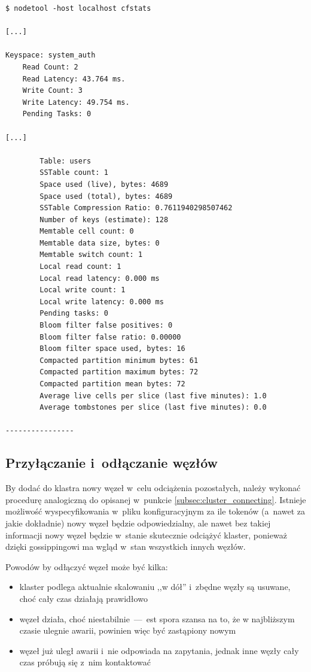 \documentclass{article} %
\begin{document}
\begin{lstlisting}[style=bash, caption={statystyki dla przestrzeni kluczy \texttt{system\_auth}}]
$ nodetool -host localhost cfstats

[...]

Keyspace: system_auth
	Read Count: 2
	Read Latency: 43.764 ms.
	Write Count: 3
	Write Latency: 49.754 ms.
	Pending Tasks: 0

[...]

		Table: users
		SSTable count: 1
		Space used (live), bytes: 4689
		Space used (total), bytes: 4689
		SSTable Compression Ratio: 0.7611940298507462
		Number of keys (estimate): 128
		Memtable cell count: 0
		Memtable data size, bytes: 0
		Memtable switch count: 1
		Local read count: 1
		Local read latency: 0.000 ms
		Local write count: 1
		Local write latency: 0.000 ms
		Pending tasks: 0
		Bloom filter false positives: 0
		Bloom filter false ratio: 0.00000
		Bloom filter space used, bytes: 16
		Compacted partition minimum bytes: 61
		Compacted partition maximum bytes: 72
		Compacted partition mean bytes: 72
		Average live cells per slice (last five minutes): 1.0
		Average tombstones per slice (last five minutes): 0.0

----------------
\end{lstlisting}

\subsection{Przyłączanie i~odłączanie węzłów}\label{sec:management_nodepool}

By dodać do klastra nowy węzeł w~celu odciążenia pozostałych, należy wykonać procedurę analogiczną do opisanej w~punkcie \ref{subsec:cluster_connecting}.
Istnieje możliwość wyspecyfikowania w~pliku konfiguracyjnym za ile tokenów (a~nawet za jakie dokładnie) nowy węzeł będzie odpowiedzialny, ale nawet bez takiej informacji nowy węzeł będzie w~stanie skutecznie odciążyć klaster, ponieważ dzięki gossippingowi ma wgląd w~stan wszystkich innych węzłów.

Powodów by odłączyć węzeł może być kilka:
\begin{itemize}
\item klaster podlega aktualnie skalowaniu ,,w dół'' i~zbędne węzły są usuwane, choć cały czas działają prawidłowo
\item węzeł działa, choć niestabilnie~---~est spora szansa na to, że w najbliższym czasie ulegnie awarii, powinien więc być zastąpiony nowym
\item węzeł już uległ awarii i~nie odpowiada na zapytania, jednak inne węzły cały czas próbują się z~nim kontaktować
\end{itemize}
\end{document}

